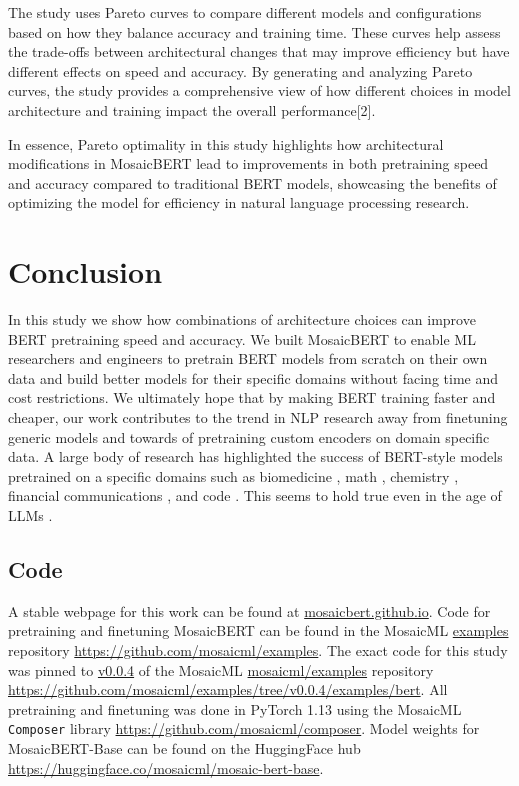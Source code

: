 \documentclass{article}
\begin{document}
The study uses Pareto curves to compare different models and configurations based on how they balance accuracy and training time. These curves help assess the trade-offs between architectural changes that may improve efficiency but have different effects on speed and accuracy. By generating and analyzing Pareto curves, the study provides a comprehensive view of how different choices in model architecture and training impact the overall performance[2].

In essence, Pareto optimality in this study highlights how architectural modifications in MosaicBERT lead to improvements in both pretraining speed and accuracy compared to traditional BERT models, showcasing the benefits of optimizing the model for efficiency in natural language processing research.

\section{Conclusion} 

In this study we show how combinations of architecture choices can improve BERT pretraining speed and accuracy.
We built MosaicBERT to enable ML researchers and engineers to pretrain BERT models from scratch on their own data and build better models for their specific domains without facing time and cost restrictions. We ultimately hope that by making BERT training faster and cheaper, our work contributes to the trend in NLP research away from finetuning generic models and towards of pretraining custom encoders on domain specific data.
A large body of research has highlighted the success of BERT-style models pretrained on a specific domains  such as biomedicine \citep{beltagy2019scibert,lee2020biobert,gu2021domain,el2022re}, math \citep{shen2021mathbert}, chemistry \citep{bai2021pre,horawalavithana2022foundation}, financial communications \citep{shah2022flue}, and code \citep{tabassum2020code}. This seems to hold true even in the age of LLMs \citep{bioMedLM,wu2023bloomberggpt}.

\subsection*{Code}
A stable webpage for this work can be found at \href{https://mosaicbert.github.io}{\url{mosaicbert.github.io}}. Code for pretraining and finetuning MosaicBERT can be found in the MosaicML \url{examples} repository \href{https://github.com/mosaicml/examples}{\url{https://github.com/mosaicml/examples}}. The exact code for this study was pinned to \url{v0.0.4} of the MosaicML \url{mosaicml/examples} repository \href{https://github.com/mosaicml/examples/tree/v0.0.4/examples/bert}{\url{https://github.com/mosaicml/examples/tree/v0.0.4/examples/bert}}. 
All pretraining and finetuning was done in PyTorch 1.13 using the MosaicML \texttt{Composer} library \href{https://github.com/mosaicml/composer}{\url{https://github.com/mosaicml/composer}}. 
Model weights for MosaicBERT-Base can be found on the HuggingFace hub \href{https://huggingface.co/mosaicml/mosaic-bert-base}{\url{https://huggingface.co/mosaicml/mosaic-bert-base}}.
\end{document}

